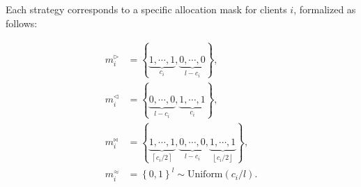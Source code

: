\documentclass[lettersize,journal]{IEEEtran}
\begin{document}
Each strategy corresponds to a specific allocation mask for clients $i$, formalized as follows:

\begin{align}\label{eq:gd-HLA-assign}
m_i^\rhd    & = \left\{\underbrace{1,\cdots,1}_{c_i},\underbrace{0,\cdots,0}_{l-c_i}\right\}, \nonumber\\
m_i^\lhd    & = \left\{\underbrace{0,\cdots,0}_{l-c_i},\underbrace{1,\cdots,1}_{c_i}\right\}, \\
m_i^{\bowtie} & = \left\{\underbrace{1,\cdots,1}_{\left \lceil {c_i}/{2}\right \rceil },\underbrace{0,\cdots,0}_{l-c_i},\underbrace{1,\cdots,1}_{\left \lfloor {c_i}/{2}\right \rfloor}\right\}, \nonumber\\
m_i^{\approx} & = \left\{0,1\right\}^{l} \sim \text{Uniform}\left(c_i/l\right).\nonumber
\end{align}


\end{document}
